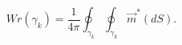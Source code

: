 \begin{equation}
Wr(\gamma _k)=\frac 1{4\pi }\oint_{\gamma _k}\oint_{\gamma _k}\vec{m}%
^{*}(dS).  \label{wrnum}
\end{equation}

